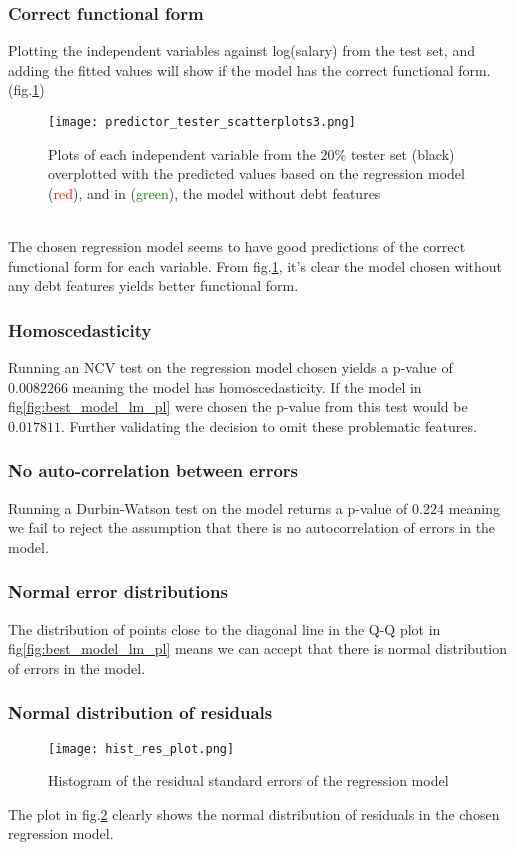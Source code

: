 \documentclass[journal]{IEEEtran}
\begin{document}
\subsubsection{Correct functional form }
Plotting the independent variables against log(salary) from the test set, and adding the fitted values will show if the model has the correct functional form. (fig.\ref{fig:predictor_tester_scatter})
\begin{figure}[h]
    \centering
    \texttt{[image: predictor\_tester\_scatterplots3.png]}
    \caption{Plots of each independent variable from the 20\% tester set (black) overplotted with the predicted values based on the regression model (\textcolor{red}{red}), and in (\textcolor{green}{green}), the model without debt features }
    \label{fig:predictor_tester_scatter}
\end{figure}
\\\indent
The chosen regression model seems to have good predictions of the correct functional form for each variable. From fig.\ref{fig:predictor_tester_scatter}, it's clear the model chosen without any debt features yields better functional form.
\subsubsection{Homoscedasticity}\label{homoscedasticity_final}
Running an NCV test\cite{ncv} on the regression model chosen yields a p-value of $0.0082266$ meaning the model has homoscedasticity. If the model in fig\ref{fig:best_model_lm_pl} were chosen the p-value from this test would be $0.017811$. Further validating the decision to omit these problematic features. 


\subsubsection{No auto-correlation between errors}
Running a Durbin-Watson test\cite{durbin_watson} on the model returns a p-value of $0.224$ meaning we fail to reject the assumption that there is no autocorrelation of errors in the model. 
\subsubsection{Normal error distributions }
The distribution of points close to the diagonal line in the Q-Q plot in fig\ref{fig:best_model_lm_pl} means we can accept that there is normal distribution of errors in the model. \cite{intro_to_stat_and_data_analysis_model_assumptions}
\subsubsection{Normal distribution of residuals}
\begin{figure}[h]
    \centering
    \texttt{[image: hist\_res\_plot.png]}
    \caption{Histogram of the residual standard errors of the regression model}
    \label{fig:hist_res_plot}
\end{figure}
\indent The plot in fig.\ref{fig:hist_res_plot} clearly shows the normal distribution of residuals in the chosen regression model. 
\end{document}
